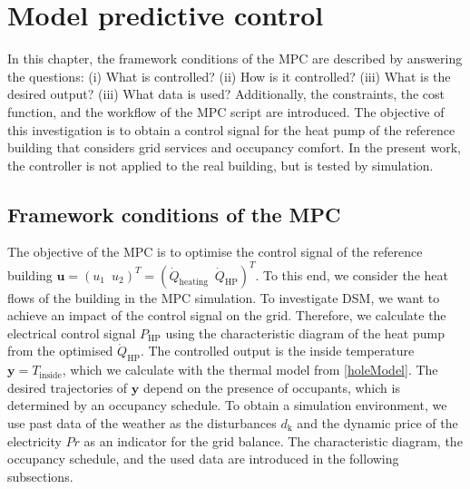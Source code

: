 \chapter{Model predictive control}
\label{ch:mpc}
In this chapter, the framework conditions of the MPC are described by answering the questions: (i) What is controlled? (ii) How is it controlled? (iii) What is the desired output? (iii) What data is used? Additionally, the constraints, the cost function, and the workflow of the MPC script are introduced. The objective of this investigation is to obtain a control signal for the heat pump of the reference building that considers grid services and occupancy comfort. In the present work, the controller is not applied to the real building, but is tested by simulation. \newline

\section{Framework conditions of the MPC}
\label{section:FrameworkMPC}
The objective of the MPC is to optimise the control signal of the reference building \newline $\mathbf{u} = (u_1 \enspace u_2)^T = (\dot{Q}_\text{heating} \enspace \dot{Q}_\text{HP})^T$. To this end, we consider the heat flows of the building in the MPC simulation. To investigate DSM, we want to achieve an impact of the control signal on the grid. Therefore, we calculate the electrical control signal $P_\text{HP}$ using the characteristic diagram of the heat pump from the optimised $\dot{Q}_\text{HP}$. The controlled output is the inside temperature $\mathbf{y} = T_\text{inside}$, which we calculate with the thermal model from \autoref{holeModel}. The desired trajectories of $\mathbf{y}$ depend on the presence of occupants, which is determined by an occupancy schedule. To obtain a simulation environment, we use past data of the weather as the disturbances $d_\text{k}$ and the dynamic price of the electricity $Pr$  as an indicator for the grid balance. The characteristic diagram, the occupancy schedule, and the used data are introduced in the following subsections.    

